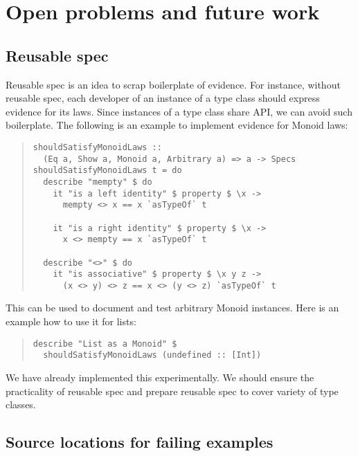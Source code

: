 \documentclass[preprint]{sigplanconf}
\begin{document}
\section{Open problems and future work}

\subsection{Reusable spec}

Reusable spec is an idea to scrap boilerplate of evidence.
For instance, without reusable spec,
each developer of an instance of a type class should
express evidence for its laws.
Since instances of a type class share API,
we can avoid such boilerplate.
The following is an example to implement
evidence for Monoid laws:

\begin{quote}
\small
\begin{verbatim}
shouldSatisfyMonoidLaws ::
  (Eq a, Show a, Monoid a, Arbitrary a) => a -> Specs
shouldSatisfyMonoidLaws t = do
  describe "mempty" $ do
    it "is a left identity" $ property $ \x ->
      mempty <> x == x `asTypeOf` t

    it "is a right identity" $ property $ \x ->
      x <> mempty == x `asTypeOf` t

  describe "<>" $ do
    it "is associative" $ property $ \x y z ->
      (x <> y) <> z == x <> (y <> z) `asTypeOf` t
\end{verbatim}
\end{quote}

\noindent This can be used to document and test arbitrary Monoid
instances.
Here is an example how to use it for lists:

\begin{quote}
\small
\begin{verbatim}
describe "List as a Monoid" $
  shouldSatisfyMonoidLaws (undefined :: [Int])
\end{verbatim}
\end{quote}

\noindent We have already implemented this experimentally.
We should ensure the practicality of reusable spec and
prepare reusable spec to cover variety of type classes.

\subsection{Source locations for failing examples}
\end{document}
